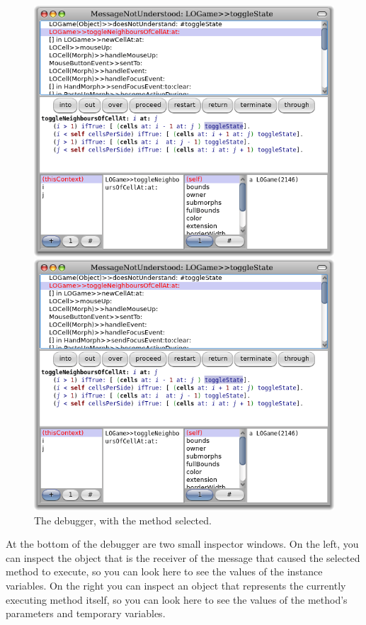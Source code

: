 \documentclass[a4paper,10pt,twoside]{book}
\begin{document}
\begin{figure}[ht]
\ifluluelse
	{\centerline {\includegraphics[width=\textwidth]{Debugger}}}
	{\centerline {\includegraphics[scale=0.7]{Debugger}}}
\caption{The debugger, with the method   selected.
}
\end{figure}

At the bottom of the debugger are two small inspector windows.  On the left, you can inspect the object that is the receiver of the message that caused the selected method to execute, so you can look here to see the values of the instance variables.
On the right you can inspect an object that represents the currently executing method itself, so you can look here to see the values of the method's parameters and temporary variables.
\end{document}
